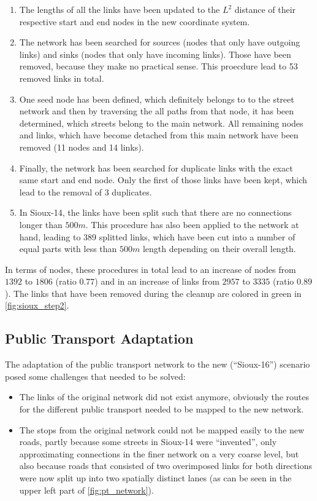 \begin{enumerate}
\item The lengths of all the links have been updated to the $L^2$ distance of their
respective start and end nodes in the new coordinate system.
\item The network has been searched for sources (nodes that only have outgoing links)
and sinks (nodes that only have incoming links). Those have been removed, because they
make no practical sense. This proecdure lead to 53 removed links in total.
\item One seed node has been defined, which definitely belongs to to the street
network and then by traversing the all paths from that node, it has been determined,
which streets belong to the main network. All remaining nodes and links, which have
become detached from this main network have been removed (11 nodes and 14 links).
\item Finally, the network has been searched for duplicate links with the exact
same start and end node. Only the first of those links have been kept, which lead
to the removal of 3 duplicates.
\item In Sioux-14, the links have been split such that there are no connections
longer than $500m$. This procedure has also been applied to the network at hand,
leading to 389 splitted links, which have been cut into a number of equal parts
with less than $500m$ length depending on their overall length.
\end{enumerate}

In terms of nodes, these procedures in total lead to an increase of nodes from
$1392$ to $1806$ (ratio $0.77$) and in an increase of links from $2957$ to $3335$ (ratio $0.89$). The links
that have been removed during the cleanup are colored in green in \cref{fig:sioux_step2}.

\subsection{Public Transport Adaptation}

The adaptation of the public transport network to the new (``Sioux-16'') scenario posed some
challenges that needed to be solved:

\begin{itemize}
\item The links of the original network did not exist anymore, obviously the
routes for the different public transport needed to be mapped to the new network.
\item The stops from the original network could not be mapped easily to the new
roads, partly because some streets in Sioux-14 were ``invented'', only approximating
connections in the finer network on a very coarse level, but also because roads
that consisted of two overimposed links for both directions were now split up into
two spatially distinct lanes (as can be seen in the upper left part of \cref{fig:pt_network}).
\end{itemize}

